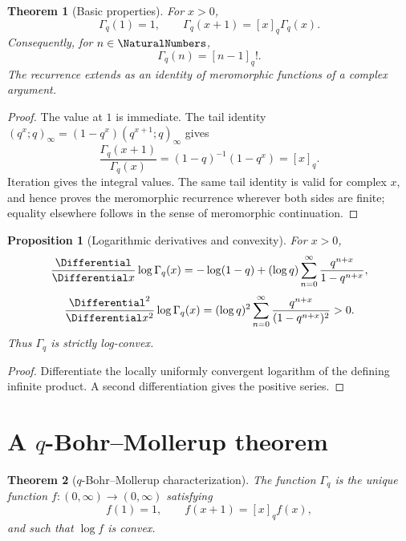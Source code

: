 \documentclass[11pt,a4paper,oneside,openany]{book}
\newtheorem{theorem}{Theorem}[chapter]
\newtheorem{proposition}[proposition]{Proposition}
\theoremstyle{definition}
\theoremstyle{remark}
\begin{document}
\begin{theorem}[Basic properties]\label{thm:qgamma-basic}
For $x>0$,
\[
 \Gamma_q(1)=1,
 \qquad
 \Gamma_q(x+1)=[x]_q\Gamma_q(x).
\]
Consequently, for $n\in\NaturalNumbers$,
\[
 \Gamma_q(n)=[n-1]_q!.
\]
The recurrence extends as an identity of meromorphic functions of a
complex argument.
\end{theorem}

\begin{proof}
The value at $1$ is immediate.  The tail identity
\(
 (q^x;q)_\infty=(1-q^x)(q^{x+1};q)_\infty
\)
gives
\[
 \frac{\Gamma_q(x+1)}{\Gamma_q(x)}
 =(1-q)^{-1}(1-q^x)=[x]_q.
\]
Iteration gives the integral values.  The same tail identity is valid for
complex $x$, and hence proves the meromorphic recurrence wherever both
sides are finite; equality elsewhere follows in the sense of
meromorphic continuation.
\end{proof}

\begin{proposition}[Logarithmic derivatives and convexity]\label{prop:qgamma-convex}
For $x>0$,
\[
 \frac{\Differential}{\Differential x}\log\Gamma_q(x)
 =-\log(1-q)+(\log q)\sum_{n=0}^{\infty}
 \frac{q^{n+x}}{1-q^{n+x}},
\]
\[
 \frac{\Differential^2}{\Differential x^2}\log\Gamma_q(x)
 = (\log q)^2\sum_{n=0}^{\infty}
 \frac{q^{n+x}}{(1-q^{n+x})^2}>0.
\]
Thus $\Gamma_q$ is strictly log-convex.
\end{proposition}

\begin{proof}
Differentiate the locally uniformly convergent logarithm of the defining infinite product.  A second differentiation gives the positive series.
\end{proof}

\section{A \texorpdfstring{$q$}{q}-Bohr--Mollerup theorem}

\begin{theorem}[$q$-Bohr--Mollerup characterization]\label{thm:q-bohr-mollerup}
The function $\Gamma_q$ is the unique function $f:(0,\infty)\to(0,\infty)$ satisfying
\[
 f(1)=1,
 \qquad
 f(x+1)=[x]_qf(x),
\]
and such that $\log f$ is convex.
\end{theorem}
\end{document}
